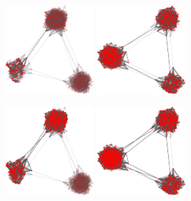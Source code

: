 \begin{figure}
\includegraphics[width=0.3\textwidth]{batchRun__kHalf=6-6-6_maxUpdate=0.02_noize=0_nbrDepth=1/network500-crop.pdf}
\hskip2cm
\includegraphics[width=0.3\textwidth]{batchRun__kHalf=6-6-6_maxUpdate=0.02_noize=0_nbrDepth=2/network500-crop.pdf}

\includegraphics[width=0.3\textwidth]{batchRun__kHalf=6-6-6_maxUpdate=0.02_noize=0_nbrDepth=1/network750-crop.pdf}
\hskip2cm
\includegraphics[width=0.3\textwidth]{batchRun__kHalf=6-6-6_maxUpdate=0.02_noize=0_nbrDepth=2/network750-crop.pdf}


\end{figure}
